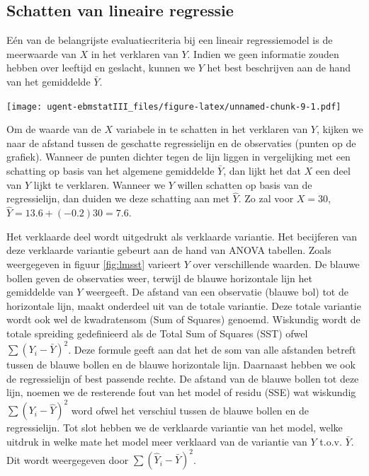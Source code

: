 \documentclass[
]{book}
\theoremstyle{definition}
\theoremstyle{definition}
\theoremstyle{definition}
\theoremstyle{definition}
\theoremstyle{remark}
\begin{document}
\hypertarget{schatten-van-lineaire-regressie}{%
\subsection*{Schatten van lineaire regressie}\label{schatten-van-lineaire-regressie}}


Eén van de belangrijste evaluatiecriteria bij een lineair regressiemodel is de meerwaarde van \(X\) in het verklaren van \(Y\). Indien we geen informatie zouden hebben over leeftijd en geslacht, kunnen we \(Y\) het best beschrijven aan de hand van het gemiddelde \(\bar{Y}\).

\texttt{[image: ugent-ebmstatIII\_files/figure-latex/unnamed-chunk-9-1.pdf]}

Om de waarde van de \(X\) variabele in te schatten in het verklaren van \(Y\), kijken we naar de afstand tussen de geschatte regressielijn en de observaties (punten op de grafiek). Wanneer de punten dichter tegen de lijn liggen in vergelijking met een schatting op basis van het algemene gemiddelde \(\bar{Y}\), dan lijkt het dat \(X\) een deel van \(Y\) lijkt te verklaren. Wanneer we \(Y\) willen schatten op basis van de regressielijn, dan duiden we deze schatting aan met \(\hat{Y}\). Zo zal voor \(X = 30\), \(\hat{Y} = 13.6 + (-0.2)30 = 7.6\).

Het verklaarde deel wordt uitgedrukt als verklaarde variantie. Het becijferen van deze verklaarde variantie gebeurt aan de hand van ANOVA tabellen. Zoals weergegeven in figuur \ref{fig:lmsst} varieert \(Y\) over verschillende waarden. De blauwe bollen geven de observaties weer, terwijl de blauwe horizontale lijn het gemiddelde van \(Y\) weergeeft. De afstand van een observatie (blauwe bol) tot de horizontale lijn, maakt onderdeel uit van de totale variantie. Deze totale variantie wordt ook wel de kwadratensom (Sum of Squares) genoemd. Wiskundig wordt de totale spreiding gedefinieerd als de Total Sum of Squares (SST) ofwel \(\sum ({Y}_i - \bar{Y})^2\). Deze formule geeft aan dat het de som van alle afstanden betreft tussen de blauwe bollen en de blauwe horizontale lijn. Daarnaast hebben we ook de regressielijn of best passende rechte. De afstand van de blauwe bollen tot deze lijn, noemen we de resterende fout van het model of residu (SSE) wat wiskundig \(\sum ({Y}_i - \hat{Y})^2\) word ofwel het verschiul tussen de blauwe bollen en de regressielijn. Tot slot hebben we de verklaarde variantie van het model, welke uitdruk in welke mate het model meer verklaard van de variantie van \(Y\) t.o.v. \(\bar{Y}\). Dit wordt weergegeven door \(\sum (\hat{Y}_i - \bar{Y})^2\).
\end{document}
